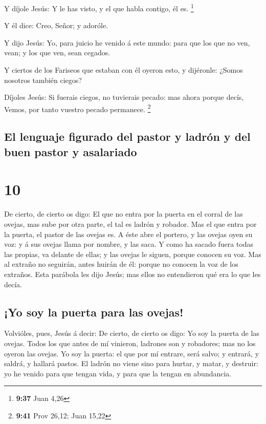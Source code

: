  Y díjole Jesús: Y le has visto, y el que habla contigo,
él es. \footnote{\textbf{9:37} Juan 4,26}

 Y él dice: Creo, Señor; y adoróle.

 Y dijo Jesús: Yo, para juicio he venido á este mundo:
para que los que no ven, vean; y los que ven, sean cegados.

 Y ciertos de los Fariseos que estaban con él oyeron
esto, y dijéronle: ¿Somos nosotros también ciegos?

 Díjoles Jesús: Si fuerais ciegos, no tuvierais pecado:
mas ahora porque decís, Vemos, por tanto vuestro pecado permanece.
\footnote{\textbf{9:41} Prov 26,12; Juan 15,22}

\hypertarget{el-lenguaje-figurado-del-pastor-y-ladruxf3n-y-del-buen-pastor-y-asalariado}{%
\subsection{El lenguaje figurado del pastor y ladrón y del buen pastor y
asalariado}\label{el-lenguaje-figurado-del-pastor-y-ladruxf3n-y-del-buen-pastor-y-asalariado}}

\hypertarget{section-9}{%
\section{10}\label{section-9}}

 De cierto, de cierto os digo: El que no entra por la
puerta en el corral de las ovejas, mas sube por otra parte, el tal es
ladrón y robador.  Mas el que entra por la puerta, el
pastor de las ovejas es.  A éste abre el portero, y las
ovejas oyen su voz: y á sus ovejas llama por nombre, y las saca.
 Y como ha sacado fuera todas las propias, va delante de
ellas; y las ovejas le siguen, porque conocen su voz.  Mas
al extraño no seguirán, antes huirán de él: porque no conocen la voz de
los extraños.  Esta parábola les dijo Jesús; mas ellos no
entendieron qué era lo que les decía.

\hypertarget{yo-soy-la-puerta-para-las-ovejas}{%
\subsection{¡Yo soy la puerta para las
ovejas!}\label{yo-soy-la-puerta-para-las-ovejas}}

 Volvióles, pues, Jesús á decir: De cierto, de cierto os
digo: Yo soy la puerta de las ovejas.  Todos los que antes
de mí vinieron, ladrones son y robadores; mas no los oyeron las ovejas.
 Yo soy la puerta: el que por mí entrare, será salvo; y
entrará, y saldrá, y hallará pastos.  El ladrón no viene
sino para hurtar, y matar, y destruir: yo he venido para que tengan
vida, y para que la tengan en abundancia.

